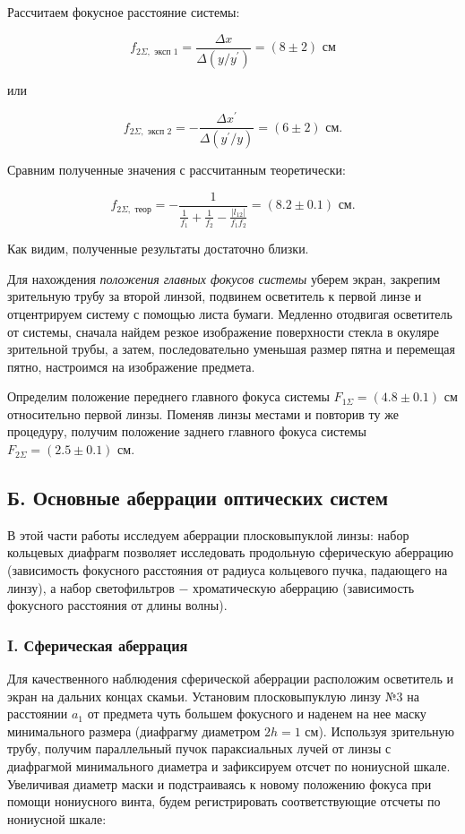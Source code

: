 \documentclass[a4paper,12pt]{article} %
\begin{document}
\hfill \break Рассчитаем фокусное расстояние системы:

$$
f_{2 \Sigma, \text{ эксп 1}} = \frac {\Delta x} {\Delta (y / y^\prime)} = (8 \pm 2) \text{ см}
$$

\hfill \break или

$$
f_{2 \Sigma, \text{ эксп 2}} = - \frac {\Delta x^\prime} {\Delta (y^\prime / y)} = (6 \pm 2) \text{ см}.
$$

\hfill \break Сравним полученные значения с рассчитанным теоретически:

$$
f_{2 \Sigma, \text{ теор}} = - \frac {1} {\frac {1} {f_{1}} + \frac {1} {f_{2}} - \frac {|l_{12}|} {f_{1}f_{2}}} = (8.2 \pm 0.1) \text{ см}.
$$

\hfill \break Как видим, полученные результаты достаточно близки.

\hfill \break Для нахождения \textit{положения главных фокусов системы} уберем экран, закрепим зрительную трубу за второй линзой, подвинем осветитель к первой линзе и отцентрируем систему с помощью листа бумаги. Медленно отодвигая осветитель от системы, сначала найдем резкое изображение поверхности стекла в окуляре зрительной трубы, а затем, последовательно уменьшая размер пятна и перемещая пятно, настроимся на изображение предмета.

\hfill \break Определим положение переднего главного фокуса системы $F_{1 \Sigma} = (4.8 \pm 0.1)$ см относительно первой линзы. Поменяв линзы местами и повторив ту же процедуру, получим положение заднего главного фокуса системы $F_{2 \Sigma} = (2.5 \pm 0.1)$ см.

\subsection*{Б. Основные аберрации оптических систем}
\hfill \break В этой части работы исследуем аберрации плосковыпуклой линзы: набор кольцевых диафрагм позволяет исследовать продольную сферическую аберрацию (зависимость фокусного расстояния от радиуса кольцевого пучка, падающего на линзу), а набор светофильтров $-$ хроматическую аберрацию (зависимость фокусного расстояния от длины волны).

\subsubsection*{I. Сферическая аберрация}
\hfill \break Для качественного наблюдения сферической аберрации расположим осветитель и экран на дальних концах скамьи. Установим плосковыпуклую линзу №3 на расстоянии $a_{1}$ от предмета чуть большем фокусного и наденем на нее маску минимального размера (диафрагму диаметром $2h = 1$ см). Используя зрительную трубу, получим параллельный пучок параксиальных лучей от линзы с диафрагмой минимального диаметра и зафиксируем отсчет по нониусной шкале. Увеличивая диаметр маски и подстраиваясь к новому положению фокуса при помощи нониусного винта, будем регистрировать соответствующие отсчеты по нониусной шкале:
\end{document}

